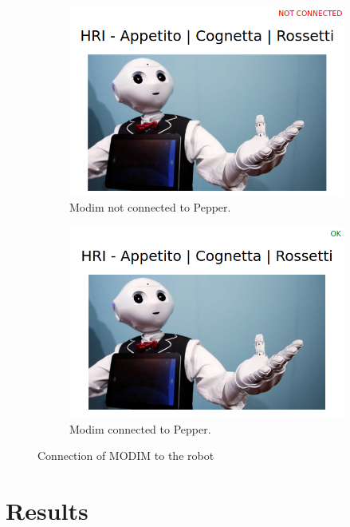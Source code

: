 \documentclass[12pt, letterpaper, twoside]{article}
\begin{document}
\begin{figure}[h]
	\centering
	\begin{subfigure}{.5\textwidth}
	  \centering
	  \includegraphics[width=1\linewidth]{img/modim_notok.png}
	  \caption{Modim not connected to Pepper.}
	  \label{fig:sub1}
	\end{subfigure}%
	\begin{subfigure}{.5\textwidth}
	  \centering
	  \includegraphics[width=1\linewidth]{img/modim_ok.png}
	  \caption{Modim connected to Pepper.}
	  \label{fig:sub2}
	\end{subfigure}
	\caption{Connection of MODIM to the robot}
	\label{fig:test}
\end{figure}

\newpage

\section{Results}
\end{document}
